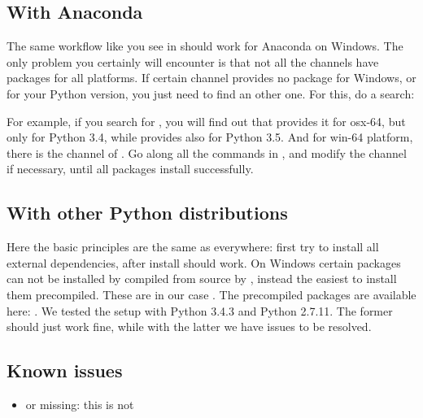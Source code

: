 \documentclass[letterpaper,10pt,english]{sphinxmanual}
\begin{document}
\subsection{With Anaconda}
\label{\detokenize{installation:with-anaconda}}
The same workflow like you see in  should work for
Anaconda on Windows. The only problem you certainly will encounter is that not
all the channels have packages for all platforms. If certain channel provides
no package for Windows, or for your Python version, you just need to find an
other one. For this, do a search:

%
\begin{sphinxVerbatim}[commandchars=\\\{\}]
     
\end{sphinxVerbatim}

For example, if you search for , you will find out that 
provides it for osx-64, but only for Python 3.4, while  provides
also for Python 3.5. And for win-64 platform, there is the channel of
. Go along all the commands in , and
modify the channel if necessary, until all packages install successfully.


\subsection{With other Python distributions}
\label{\detokenize{installation:with-other-python-distributions}}
Here the basic principles are the same as everywhere: first try to install all
external dependencies, after  install should work. On Windows certain
packages can not be installed by compiled from source by , instead the
easiest to install them precompiled. These are in our case . The
precompiled packages are available here:
. We tested the setup with Python
3.4.3 and Python 2.7.11. The former should just work fine, while with the
latter we have issues to be resolved.


\subsection{Known issues}
\label{\detokenize{installation:known-issues}}\begin{itemize}
\item {} 
 \textendash{} or  missing: this is not

\end{itemize}
\end{document}
